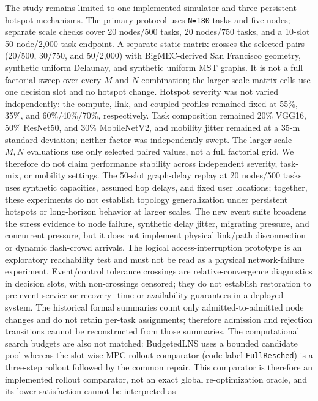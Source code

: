 \documentclass[preprint,12pt]{elsarticle}
\begin{document}
The study remains limited to one implemented simulator and three persistent
hotspot mechanisms. The primary protocol uses \texttt{N=180} tasks and five
nodes; separate scale checks cover 20 nodes/500 tasks, 20 nodes/750 tasks,
and a 10-slot 50-node/2,000-task endpoint. A separate static matrix crosses
the selected pairs (20/500, 30/750, and 50/2,000) with BigMEC-derived
San Francisco geometry, synthetic uniform Delaunay, and synthetic uniform
MST graphs. It is not a full factorial sweep over every $M$ and $N$
combination; the larger-scale matrix cells use one decision slot and no
hotspot change. Hotspot severity was not varied independently: the compute,
link, and coupled profiles remained fixed at 55\%, 35\%, and 60\%/40\%/70\%,
respectively. Task composition remained 20\% VGG16, 50\% ResNet50, and 30\%
MobileNetV2, and mobility jitter remained at a 35-m standard deviation; neither
factor was independently swept. The larger-scale $M,N$ evaluations use only
selected paired values, not a full factorial grid. We therefore do not claim
performance stability across independent severity, task-mix, or mobility
settings. The 50-slot graph-delay replay at 20 nodes/500 tasks uses
synthetic capacities, assumed hop delays, and fixed user locations; together,
these experiments do not establish topology generalization under persistent
hotspots or long-horizon behavior at larger scales. The new event suite broadens the
stress evidence to node failure, synthetic delay jitter, migrating pressure,
and concurrent pressure, but it does not implement physical link/path
disconnection or dynamic flash-crowd arrivals. The logical access-interruption
prototype is an exploratory reachability test and must not be read as a
physical network-failure experiment. Event/control tolerance crossings are
relative-convergence diagnostics in decision slots, with non-crossings
censored; they do not establish restoration to pre-event service or recovery-
time or availability guarantees in a deployed system. The historical formal summaries count only
admitted-to-admitted node changes and do not retain per-task assignments;
therefore admission and rejection transitions cannot be reconstructed from
those summaries. The computational search budgets are also not matched:
BudgetedLNS uses a bounded candidate pool whereas the slot-wise MPC rollout
comparator (code label \texttt{FullResched}) is a three-step rollout followed
by the common repair. This comparator is therefore an implemented rollout comparator, not an exact global
re-optimization oracle, and its lower satisfaction cannot be interpreted as
\end{document}
